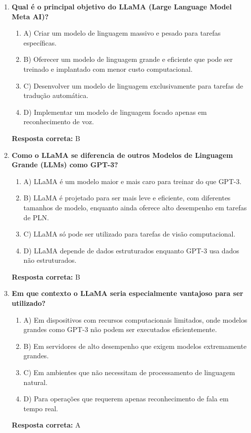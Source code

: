 \documentclass[14pt,a4paper,oneside]{book}
\begin{document}
\begin{enumerate}
	
	\item \textbf{Qual é o principal objetivo do LLaMA (Large Language Model Meta AI)?}
	\begin{enumerate}[label=\alph*)]
		\item A) Criar um modelo de linguagem massivo e pesado para tarefas específicas.
		\item B) Oferecer um modelo de linguagem grande e eficiente que pode ser treinado e implantado com menor custo computacional.
		\item C) Desenvolver um modelo de linguagem exclusivamente para tarefas de tradução automática.
		\item D) Implementar um modelo de linguagem focado apenas em reconhecimento de voz.
	\end{enumerate}
	\vspace{5mm}
	\textbf{Resposta correta:} B
	
	\item \textbf{Como o LLaMA se diferencia de outros Modelos de Linguagem Grande (LLMs) como GPT-3?}
	\begin{enumerate}[label=\alph*)]
		\item A) LLaMA é um modelo maior e mais caro para treinar do que GPT-3.
		\item B) LLaMA é projetado para ser mais leve e eficiente, com diferentes tamanhos de modelo, enquanto ainda oferece alto desempenho em tarefas de PLN.
		\item C) LLaMA só pode ser utilizado para tarefas de visão computacional.
		\item D) LLaMA depende de dados estruturados enquanto GPT-3 usa dados não estruturados.
	\end{enumerate}
	\vspace{5mm}
	\textbf{Resposta correta:} B
	
	\item \textbf{Em que contexto o LLaMA seria especialmente vantajoso para ser utilizado?}
	\begin{enumerate}[label=\alph*)]
		\item A) Em dispositivos com recursos computacionais limitados, onde modelos grandes como GPT-3 não podem ser executados eficientemente.
		\item B) Em servidores de alto desempenho que exigem modelos extremamente grandes.
		\item C) Em ambientes que não necessitam de processamento de linguagem natural.
		\item D) Para operações que requerem apenas reconhecimento de fala em tempo real.
	\end{enumerate}
	\vspace{5mm}
	\textbf{Resposta correta:} A
	

\end{enumerate}
\end{document}
